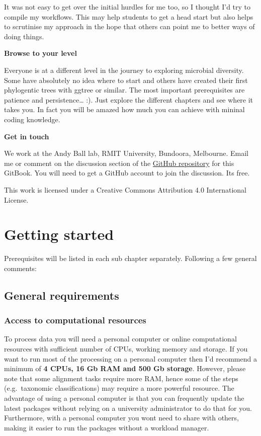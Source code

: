 \documentclass[
]{book}
\begin{document}
It was not easy to get over the initial hurdles for me too, so I thought I'd try to compile my workflows. This may help students to get a head start but also helps to scrutinise my approach in the hope that others can point me to better ways of doing things.

\textbf{Browse to your level}

Everyone is at a different level in the journey to exploring microbial diversity. Some have absolutely no idea where to start and others have created their first phylogentic trees with ggtree or similar. The most important prerequisites are patience and persistence\ldots{} :). Just explore the different chapters and see where it takes you. In fact you will be amazed how much you can achieve with mininal coding knowledge.

\textbf{Get in touch}

We work at the Andy Ball lab, RMIT University, Bundoora, Melbourne. Email me or comment on the discussion section of the \href{https://github.com/chrismitbiz/ABlab-workflows/discussions/}{GitHub repository} for this GitBook. You will need to get a GitHub account to join the discussion. Its free.

This work is licensed under a Creative Commons Attribution 4.0 International License.

\hypertarget{gettingstarted}{%
\chapter{Getting started}\label{gettingstarted}}

Prerequisites will be listed in each sub chapter separately.
Following a few general comments:

\hypertarget{general-requirements}{%
\section{General requirements}\label{general-requirements}}

\hypertarget{access-to-computational-resources}{%
\subsection{Access to computational resources}\label{access-to-computational-resources}}

To process data you will need a personal computer or online computational resources with sufficient number of CPUs, working memory and storage. If you want to run most of the processing on a personal computer then I'd recommend a minimum of \textbf{4 CPUs, 16 Gb RAM and 500 Gb storage}. However, please note that some alignment tasks require more RAM, hence some of the steps (e.g.~taxonomic classifications) may require a more powerful resource. The advantage of using a personal computer is that you can frequently update the latest packages without relying on a university administrator to do that for you. Furthermore, with a personal computer you wont need to share with others, making it easier to run the packages without a workload manager.
\end{document}
